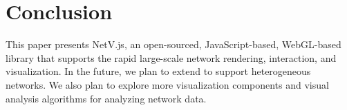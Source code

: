 \section{Conclusion}
This paper presents NetV.js, an open-sourced, JavaScript-based, WebGL-based library that supports the rapid large-scale network rendering, interaction, and visualization. In the future, we plan to extend \name to support heterogeneous networks. We also plan to explore more visualization components and visual analysis algorithms for analyzing network data.